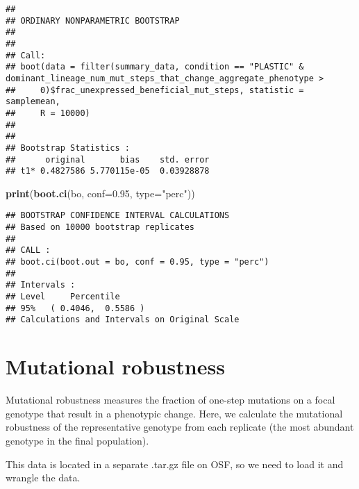 \documentclass[]{book}
\newenvironment{Shaded}{\begin{snugshade}}{\end{snugshade}}
\newcommand{\DataTypeTok}[1]{\textcolor[rgb]{0.13,0.29,0.53}{#1}}
\newcommand{\FloatTok}[1]{\textcolor[rgb]{0.00,0.00,0.81}{#1}}
\newcommand{\KeywordTok}[1]{\textcolor[rgb]{0.13,0.29,0.53}{\textbf{#1}}}
\newcommand{\NormalTok}[1]{#1}
\newcommand{\StringTok}[1]{\textcolor[rgb]{0.31,0.60,0.02}{#1}}
\begin{document}
\begin{verbatim}
## 
## ORDINARY NONPARAMETRIC BOOTSTRAP
## 
## 
## Call:
## boot(data = filter(summary_data, condition == "PLASTIC" & dominant_lineage_num_mut_steps_that_change_aggregate_phenotype > 
##     0)$frac_unexpressed_beneficial_mut_steps, statistic = samplemean, 
##     R = 10000)
## 
## 
## Bootstrap Statistics :
##      original       bias    std. error
## t1* 0.4827586 5.770115e-05  0.03928878
\end{verbatim}

\begin{Shaded}
\begin{Highlighting}[]
\KeywordTok{print}\NormalTok{(}\KeywordTok{boot.ci}\NormalTok{(bo, }\DataTypeTok{conf=}\FloatTok{0.95}\NormalTok{, }\DataTypeTok{type=}\StringTok{"perc"}\NormalTok{))}
\end{Highlighting}
\end{Shaded}

\begin{verbatim}
## BOOTSTRAP CONFIDENCE INTERVAL CALCULATIONS
## Based on 10000 bootstrap replicates
## 
## CALL : 
## boot.ci(boot.out = bo, conf = 0.95, type = "perc")
## 
## Intervals : 
## Level     Percentile     
## 95%   ( 0.4046,  0.5586 )  
## Calculations and Intervals on Original Scale
\end{verbatim}

\hypertarget{mutational-robustness}{%
\section{Mutational robustness}\label{mutational-robustness}}

Mutational robustness measures the fraction of one-step mutations on a focal genotype that result in a phenotypic change.
Here, we calculate the mutational robustness of the representative genotype from each replicate (the most abundant genotype in the final population).

This data is located in a separate .tar.gz file on OSF, so we need to load it and wrangle the data.
\end{document}
